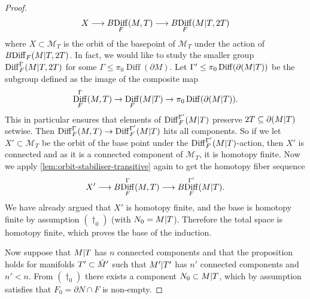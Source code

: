 \documentclass{amsart}
\theoremstyle{plain}
\theoremstyle{definition}
\DeclareMathOperator\Diff{Diff}
\newcommand{\interior}[1]{\smash{\mathring{#1}}}
\newcommand{\ca}{\smash{\mid}} %
\newcommand{\BDiff}{B\!\Diff}
\newcommand{\calM}{\mathcal{M}}
\begin{document}
\begin{proof}
    \[
        X \longrightarrow \BDiff_F(M, T) \longrightarrow \BDiff_F(M \ca T, 2T)
    \]
    where $X \subset \calM_{T}$ is the orbit of the basepoint of $\calM_{T}$ under the action of $\BDiff_F(M \ca T, 2T)$.
    In fact, we would like to study the smaller group $\Diff_F^\Gamma(M\ca T, 2T)$ for some $\Gamma \le \pi_0\Diff(\partial M)$.
    Let $\Gamma' \le \pi_0\Diff(\partial (M \ca T))$ be the subgroup defined as the image of the composite map
    \[
        \Diff_F^\Gamma(M, T) \to \Diff_F(M \ca T) \to \pi_0 \Diff(\partial (M \ca T)).
    \]
    This in particular ensures that elements of $\Diff_F^{\Gamma'}(M \ca T)$ preserve $2T \subseteq \partial (M \ca T)$ setwise.
    Then $\Diff_F^\Gamma(M, T) \to \Diff_F^{\Gamma'}(M \ca T)$ hits all components.
    So if we let $X' \subset \calM_{T}$ be the orbit of the base point under the $\Diff_F^{\Gamma'}(M \ca T)$-action, then $X'$ is connected and as it is a connected component of $\calM_{T}$, it is homotopy finite.
    Now we apply \cref{lem:orbit-stabiliser-transitive} again to get the homotopy fiber sequence
    \[
        X' \longrightarrow \BDiff_F^{\Gamma}(M, T) \longrightarrow \BDiff_F^{\Gamma'}(M \ca T).
    \]
    We have already argued that $X'$ is homotopy finite, and the base is homotopy finite by assumption $(\dagger_0)$ (with $N_0=M\ca T$).
    Therefore the total space is homotopy finite, which proves the base of the induction.

    Now suppose that $M \ca T$ has $n$ connected components and that the proposition holds for manifolds $T'\subset \interior{M}'$ such that $M'\ca T'$ has $n'$ connected components and $n'<n$.
    From $(\dagger_0)$ there exists a component $N_0 \subset M \ca T$, which by assumption satisfies that $F_0 = \partial N \cap F$ is non-empty. 


\end{proof}
\end{document}
